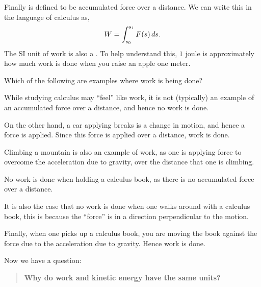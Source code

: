 \documentclass{ximera}
\begin{document}
Finally  is defined to be accumulated force over a
distance. We can write this in the language of calculus as,
\[
W = \int_{s_0}^{s_1} F(s) \,d s.
\]
The SI unit of work is also a . To help understand this,
$1$ joule is approximately how much work is done when you raise an
apple one meter.
\begin{question}
  Which of the following are examples where work is being done?
  \begin{selectAll}
  \end{selectAll}
  \begin{feedback}
    While studying calculus may ``feel'' like work, it is not
    (typically) an example of an accumulated force over a distance,
    and hence no work is done.

    On the other hand, a car applying breaks is a change in motion, and
    hence a force is applied. Since this force is applied over a
    distance, work is done.

    Climbing a mountain is also an example of work, as one is applying
    force to overcome the acceleration due to gravity, over the
    distance that one is climbing.

    No work is done when holding a calculus book, as there is no
    accumulated force over a distance.

    It is also the case that no work is done when one walks around
    with a calculus book, this is because the ``force'' is in a
    direction perpendicular to the motion.

    Finally, when one picks up a calculus book, you are moving the
    book against the force due to the acceleration due to
    gravity. Hence work is done.
  \end{feedback}
\end{question}



Now we have a question:
\begin{quote}
 \textbf{Why do work and kinetic energy have the same units?}
\end{quote}
\end{document}
